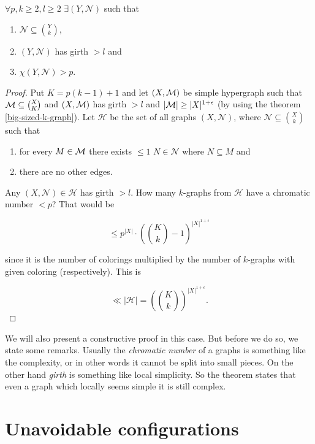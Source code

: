 \begin{cor}
	$\forall p, k \geq 2, l \geq 2$ $\exists (Y, \mathcal{N})$ such that
	
	\begin{enumerate}
		\item $\mathcal{N} \subseteq \binom{Y}{k}$,
		\item $(Y, \mathcal{N})$ has girth $> l$ and
		\item $\chi(Y, \mathcal{N}) > p$.
	\end{enumerate}
	\label{chromatic-girth}
\end{cor}

\begin{proof}
	Put $K = p (k-1) + 1$ and let $(X, \mathcal{M})$ be simple hypergraph such that $\mathcal{M} \subseteq \binom{X}{K}$ and $(X, \mathcal{M})$ has girth $> l$ and $|\mathcal{M}| \geq |X|^{1+\epsilon}$ (by using the theorem \ref{big-sized-k-graph}). Let $\mathcal{H}$ be the set of all graphs $(X, \mathcal{N})$, where $\mathcal{N} \subseteq \binom{X}{k}$ such that
	
	\begin{enumerate}
		\item for every $M \in \mathcal{M}$ there exists $\leq 1$ $N \in \mathcal{N}$ where $N \subseteq M$ and
		\item there are no other edges.
	\end{enumerate}
	
	\noindent Any $(X, \mathcal{N}) \in \mathcal{H}$ has girth $> l$. How many $k$-graphs from $\mathcal{H}$ have a chromatic number $< p$? That would be
	
	$$
	\leq p^{|X|} \cdot \left(\binom{K}{k} - 1\right)^{|X|^{1 + \epsilon}}
	$$
	
	\noindent since it is the number of colorings multiplied by the number of $k$-graphs with given coloring (respectively). This is
	
	$$
	\ll |\mathcal{H}| = \left(\binom{K}{k}\right)^{|X|^{1 + \epsilon}}.
	$$
\end{proof}

We will also present a constructive proof in this case. But before we do so, we state some remarks. Usually the \textit{chromatic number} of a graphs is something like the complexity, or in other words it cannot be split into small pieces. On the other hand \textit{girth} is something like local simplicity. So the theorem states that even a graph which locally seems simple it is still complex.

\section{Unavoidable configurations}

